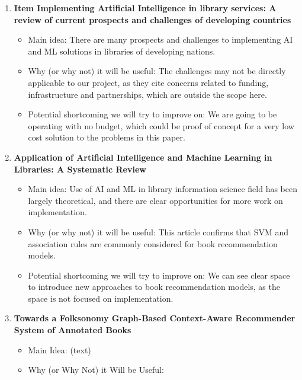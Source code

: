 \begin{enumerate}[label=(\arabic*)]
\begin{itemize}
    \end{itemize}
    \item \cite{barsha2023implementing} \textbf{Item Implementing Artificial Intelligence in library services: A review of current prospects and challenges of developing countries}
    \begin{itemize}
        \item Main idea: There are many prospects and challenges to implementing AI and ML solutions in libraries of developing nations.
        \item Why (or why not) it will be useful: The challenges may not be directly applicable to our project, as they cite concerns related to funding, infrastructure and partnerships, which are outside the scope here.
        \item Potential shortcoming we will try to improve on: We are going to be operating with no budget, which could be proof of concept for a very low cost solution to the problems in this paper.
    \end{itemize}
    \item \cite{kumar2021application}
    \textbf{Application of Artificial Intelligence and Machine Learning in Libraries: A Systematic Review}
    \begin{itemize}
        \item Main idea: Use of AI and ML in library information science field has been largely theoretical, and there are clear opportunities for more work on implementation.
        \item Why (or why not) it will be useful: This article confirms that SVM and association rules are commonly considered for book recommendation models.
        \item Potential shortcoming we will try to improve on: We can see clear space to introduce new approaches to book recommendation models, as the space is not focused on implementation.
    \end{itemize}
    \item \cite{qassimi2021folksonomy}
    \textbf{Towards a Folksonomy Graph-Based Context-Aware Recommender System of Annotated Books}
    \begin{itemize}
        \item Main Idea: (text)
        \item Why (or Why Not) it Will be Useful:

\end{itemize}
\end{enumerate}
